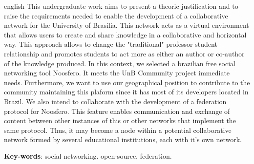 \begin{resumo}[Abstract]
  \begin{otherlanguage*}{english}   
  This undergraduate work aims to present a theoric justification and to raise
  the requirements needed to enable the development of a collaborative network for
  the University of Brasília.
  This network acts as a virtual environment that allows users to create and share
  knowledge in a collaborative and horizontal way.
  This approach allows to change the "traditional" professor-student relationship
  and promotes students to act more as either an author or co-author of the
  knowledge produced.
  In this context, we selected a brazilian free social networking tool Noosfero.
  It meets the UnB Community project immediate needs. Furthermore, we want to use
  our geographical position to contribute to the community maintaining this plaform
  since it has most of its developers located in Brazil.
  We also intend to collaborate with the development of a federation protocol for
  Noosfero. This feature enables communication and exchange of content between
  other instances of this or other networks that implement the same protocol.
  Thus, it may become a node within a potential collaborative network formed by
  several educational institutions, each with it’s own network.
   

  \vspace{\onelineskip}
 
  \noindent 
  \textbf{Key-words}: social networking. open-source. federation.
  \end{otherlanguage*}
\end{resumo}


